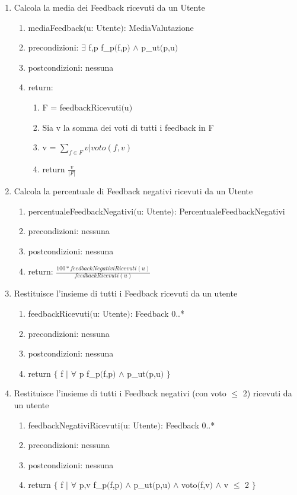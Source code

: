 \documentclass{article}
\begin{document}
\begin{enumerate}
\begin{enumerate}
\begin{enumerate}
        \end{enumerate}
    \end{enumerate}
    \item Calcola la media dei Feedback ricevuti da un Utente
    \begin{enumerate}
        \item mediaFeedback$($u: Utente$)$: MediaValutazione
        \item precondizioni: $\exists$ f,p f\_p$($f,p$)$ $\land$ p\_ut$($p,u$)$
        \item postcondizioni: nessuna
        \item return:
        \begin{enumerate}
            \item F = feedbackRicevuti$($u$)$
            \item Sia v la somma dei voti di tutti i feedback in F
            \item v = $\sum_{f \in F} v | voto(f,v)$
            \item return $\frac{v}{|F|}$
        \end{enumerate}
    \end{enumerate}
    \item Calcola la percentuale di Feedback negativi ricevuti da un Utente
    \begin{enumerate}
        \item percentualeFeedbackNegativi$($u: Utente$)$: PercentualeFeedbackNegativi
        \item precondizioni: nessuna
        \item postcondizioni: nessuna
        \item return: $\frac{100*feedbackNegativiRicevuti(u)}{feedbackRicevuti(u)}$
    \end{enumerate}
    \item Restituisce l'insieme di tutti i Feedback ricevuti da un utente
    \begin{enumerate}
        \item feedbackRicevuti$($u: Utente$)$: Feedback 0..*
        \item precondizioni: nessuna
        \item postcondizioni: nessuna
        \item return $\{$ f $|$ $\forall$ p f\_p$($f,p$)$ $\land$ p\_ut$($p,u$)$ $\}$
    \end{enumerate}
    \item Restituisce l'insieme di tutti i Feedback negativi (con voto $\leq$ 2) ricevuti da un utente
    \begin{enumerate}
        \item feedbackNegativiRicevuti$($u: Utente$)$: Feedback 0..*
        \item precondizioni: nessuna
        \item postcondizioni: nessuna
        \item return $\{$ f $|$ $\forall$ p,v f\_p$($f,p$)$ $\land$ p\_ut$($p,u$)$ $\land$ voto$($f,v$)$ $\land$ v $\leq$ 2 $\}$
    \end{enumerate}
\end{enumerate}
\end{document}
